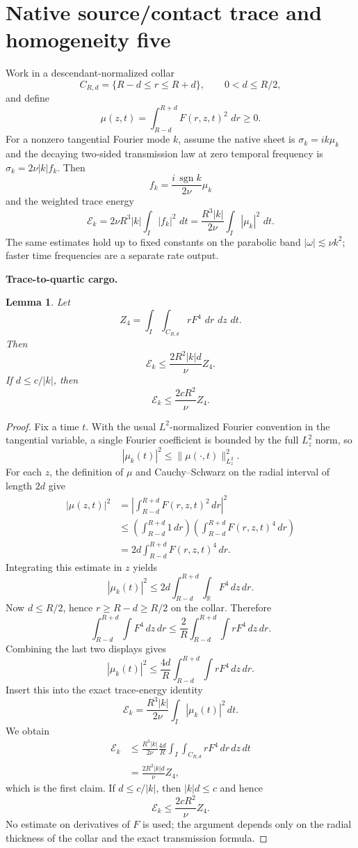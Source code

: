 \documentclass[11pt]{article}
\newtheorem{lemma}[theorem]{Lemma}
\theoremstyle{definition}\newtheorem{definition}[theorem]{Definition}
\theoremstyle{remark}\newtheorem{remark}[theorem]{Remark}
\newcommand{\R}{\mathbb R}\newcommand{\dd}{\,d}\newcommand{\HH}{\mathcal H}
\begin{document}
\section{Native source/contact trace and homogeneity five}
Work in a descendant-normalized collar
\[
C_{R,d}=\{R-d\le r\le R+d\},\qquad 0<d\le R/2,
\]
and define
\[
\mu(z,t)=\int_{R-d}^{R+d}F(r,z,t)^2\,\dd r\ge0.
\]
For a nonzero tangential Fourier mode $k$, assume the native sheet is $\sigma_k=ik\mu_k$ and the decaying two-sided transmission law at zero temporal frequency is $\sigma_k=2\nu|k|f_k$. Then
\[
f_k=\frac{i\,\operatorname{sgn}k}{2\nu}\mu_k
\]
and the weighted trace energy
\[
\mathcal E_k=2\nu R^3|k|\int_I|f_k|^2\,\dd t
=\frac{R^3|k|}{2\nu}\int_I|\mu_k|^2\,\dd t.
\]
The same estimates hold up to fixed constants on the parabolic band $|\omega|\lesssim\nu k^2$; faster time frequencies are a separate rate output.

\medskip
\noindent\textbf{Trace-to-quartic cargo.}
\begin{lemma}\label{lem:tracecargo}
Let
\[
Z_4=\int_I\int_{C_{R,d}}rF^4\,\dd r\,\dd z\,\dd t.
\]
Then
\[
\boxed{\mathcal E_k\le\frac{2R^2|k|d}{\nu}Z_4.}
\]
If $d\le c/|k|$, then
\[
\boxed{\mathcal E_k\le\frac{2cR^2}{\nu}Z_4.}
\]
\end{lemma}
\begin{proof}
Fix a time $t$.  With the usual $L^2$-normalized Fourier convention in the tangential variable, a single Fourier coefficient is bounded by the full $L^2_z$ norm, so
\[
 |\mu_k(t)|^2\le \|\mu(\cdot,t)\|_{L_z^2}^2.
\]
For each $z$, the definition of $\mu$ and Cauchy--Schwarz on the radial interval of length $2d$ give
\[
 \begin{aligned}
 |\mu(z,t)|^2
 &=\left|\int_{R-d}^{R+d}F(r,z,t)^2\,dr\right|^2\\
 &\le
 \left(\int_{R-d}^{R+d}1\,dr\right)
 \left(\int_{R-d}^{R+d}F(r,z,t)^4\,dr\right)\\
 &=2d\int_{R-d}^{R+d}F(r,z,t)^4\,dr.
 \end{aligned}
\]
Integrating this estimate in $z$ yields
\[
 |\mu_k(t)|^2
 \le2d\int_{R-d}^{R+d}\int_{\R}F^4\,dz\,dr.
\]
Now $d\le R/2$, hence $r\ge R-d\ge R/2$ on the collar.  Therefore
\[
 \int_{R-d}^{R+d}\int F^4\,dz\,dr
 \le \frac2R
 \int_{R-d}^{R+d}\int rF^4\,dz\,dr.
\]
Combining the last two displays gives
\[
 |\mu_k(t)|^2
 \le \frac{4d}{R}
 \int_{R-d}^{R+d}\int rF^4\,dz\,dr.
\]
Insert this into the exact trace-energy identity
\[
 \mathcal E_k
 =\frac{R^3|k|}{2\nu}\int_I|\mu_k(t)|^2\,dt.
\]
We obtain
\[
 \begin{aligned}
 \mathcal E_k
 &\le \frac{R^3|k|}{2\nu}\frac{4d}{R}
 \int_I\int_{C_{R,d}}rF^4\,dr\,dz\,dt\\
 &=\frac{2R^2|k|d}{\nu}Z_4,
 \end{aligned}
\]
which is the first claim.  If $d\le c/|k|$, then $|k|d\le c$ and hence
\[
 \mathcal E_k\le\frac{2cR^2}{\nu}Z_4.
\]
No estimate on derivatives of $F$ is used; the argument depends only on the radial thickness of the collar and the exact transmission formula.
\end{proof}
\end{document}
